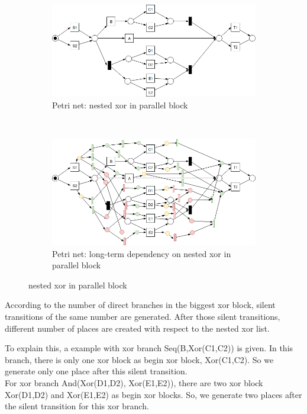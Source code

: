\documentclass[]{article}
\begin{document}
\begin{figure}[h]
	\begin{subfigure}[b]{\textwidth}
		\centering
		\includegraphics[width=\linewidth]{PN10_NestedXorInParallel_01.png}
		\caption{Petri net: nested xor in parallel block}
		\label{fig:pn_nested_xor_in_parallel}
	\end{subfigure}%
   \\
	\begin{subfigure}[b]{\textwidth}
		\centering
		\includegraphics[width=\linewidth]{PN10_NestedXorInParallel_02.png}
		\caption{Petri net: long-term dependency on nested xor in parallel block}
		\label{fig:pn_lt_nested_xor_in_parallel}
	\end{subfigure}%
	\caption{nested xor in parallel block}
	\label{fig:nested_and_situation}
\end{figure}
According to the number of direct branches in the biggest xor block, silent transitions of the same number are generated. After those silent transitions, different number of places are created with respect to the nested xor list. 

To explain this, a example with xor branch Seq(B,Xor(C1,C2)) is given. In this branch, there is only one xor block as begin xor block, Xor(C1,C2). So we generate only one place after this silent transition. \\
For xor branch And(Xor(D1,D2), Xor(E1,E2)), there are two xor block Xor(D1,D2) and Xor(E1,E2) as begin xor blocks. So, we generate two places after the silent transition for this xor branch. 
\end{document}
